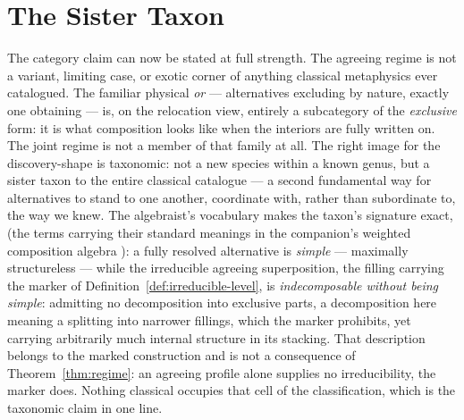 \documentclass[11pt]{article}
\begin{document}
\section{The Sister Taxon}\label{sec:taxon}
The category claim can now be stated at full strength. The agreeing regime is not a variant, limiting case, or exotic corner of anything classical metaphysics ever catalogued. The familiar physical \emph{or} --- alternatives excluding by nature, exactly one obtaining --- is, on the relocation view, entirely a subcategory of the \emph{exclusive} form: it is what composition looks like when the interiors are fully written on. The joint regime is not a member of that family at all. The right image for the discovery-shape is taxonomic: not a new species within a known genus, but a sister taxon to the entire classical catalogue --- a second fundamental way for alternatives to stand to one another, coordinate with, rather than subordinate to, the way we knew. The algebraist's vocabulary makes the taxon's signature exact, (the terms carrying their standard meanings in the companion's weighted composition algebra \parencite{Aethus}): a fully resolved alternative is \emph{simple} --- maximally structureless --- while the irreducible agreeing superposition, the filling carrying the marker of Definition~\ref{def:irreducible-level}, is \emph{indecomposable without being simple}: admitting no decomposition into exclusive parts, a decomposition here meaning a splitting into narrower fillings, which the marker prohibits, yet carrying arbitrarily much internal structure in its stacking. That description belongs to the marked construction and is not a consequence of Theorem~\ref{thm:regime}: an agreeing profile alone supplies no irreducibility, the marker does. Nothing classical occupies that cell of the classification, which is the taxonomic claim in one line.
\end{document}
